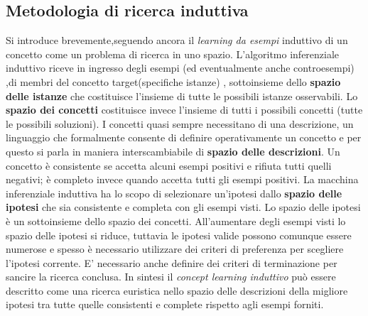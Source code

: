 \subsection{Metodologia di ricerca induttiva}
Si introduce brevemente,seguendo ancora \cite{Mic86a} il \textit{learning da esempi} induttivo di un concetto come un problema di ricerca in uno spazio. L'algoritmo inferenziale induttivo riceve in ingresso degli esempi (ed eventualmente anche controesempi) ,di membri del concetto target(specifiche istanze) , sottoinsieme dello \textbf{spazio delle istanze} che costituisce l'insieme di tutte le possibili istanze osservabili. Lo \textbf{spazio dei concetti} costituisce invece l'insieme di tutti i possibili concetti (tutte le possibili soluzioni). I concetti quasi sempre necessitano di una descrizione, un linguaggio che formalmente consente di definire operativamente un concetto e per questo si parla in maniera interscambiabile di \textbf{spazio delle descrizioni}. Un concetto è consistente se accetta alcuni esempi positivi e rifiuta tutti quelli negativi; è completo invece quando accetta tutti gli esempi positivi. La macchina inferenziale induttiva ha lo scopo di selezionare un'ipotesi dallo \textbf{spazio delle ipotesi} che sia consistente e completa con gli esempi visti. Lo spazio delle ipotesi è un sottoinsieme dello spazio dei concetti. All'aumentare degli esempi visti lo spazio delle ipotesi si riduce, tuttavia le ipotesi valide possono comunque essere numerose e spesso è necessario utilizzare dei criteri di preferenza per scegliere l'ipotesi corrente. E' necessario anche definire dei criteri di terminazione per sancire la ricerca conclusa.  In sintesi il \textit{concept learning induttivo} può essere descritto come una ricerca euristica nello spazio delle descrizioni della migliore ipotesi tra tutte quelle consistenti e complete rispetto agli esempi forniti.
